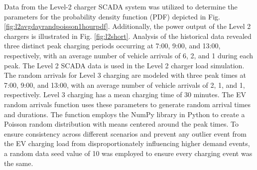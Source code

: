 \documentclass[conference,  usletter]{IEEEtran}
\begin{document}
Data from the Level-2 charger SCADA system was utilized to determine the parameters for the probability density function (PDF) depicted in Fig. \ref{fig:l2avgdayrandpoisson1hourpdf}. Additionally, the power output of the Level 2 chargers is illustrated in Fig. \ref{fig:l2short}. Analysis of the historical data revealed three distinct peak charging periods occurring at 7:00, 9:00, and  13:00, respectively, with an average number of vehicle arrivals of 6, 2, and 1 during each peak. The Level 2 SCADA data is used in the Level 2 charger load simulation. The random arrivals for Level 3 charging are modeled with three peak times at 7:00, 9:00, and 13:00, with an average number of vehicle arrivals of 2, 1,  and 1, respectively. Level 3 charging has a mean charging time of 30 minutes. The EV random arrivals function uses these parameters to generate random arrival times and durations. The function employs the NumPy library\cite{NumPy}\cite{numpy_poi} in Python to create a Poisson random distribution with means centered around the peak times. To ensure consistency across different scenarios and prevent any outlier event from the EV charging load from disproportionately influencing higher demand events, a random data seed value of 10 was employed to ensure every charging event was the same. 
\end{document}
